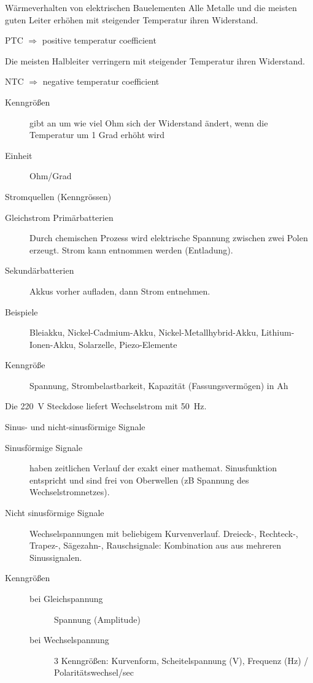 \documentclass[avery5371,grid,frame,a4paper]{flashcards}
\newcommand{\card}[3]{
  \begin{flashcard}[{\chap} -- #1]{#2}#3\end{flashcard}
}
\begin{document}
\card{05}{Wärmeverhalten von elektrischen Bauelementen}{
  Alle Metalle und die meisten guten Leiter erhöhen mit steigender Temperatur ihren Widerstand.
  \centerline{PTC $\Rightarrow$ positive temperatur coefficient}
  Die meisten Halbleiter verringern mit steigender Temperatur ihren Widerstand.
  \centerline{NTC $\Rightarrow$ negative temperatur coefficient}
  \small
  \begin{description}
    \item[Kenngrößen] gibt an um wie viel Ohm sich der Widerstand ändert, wenn die Temperatur um 1 Grad erhöht wird
    \item[Einheit] Ohm/Grad
  \end{description}
}

\card{06}{Stromquellen (Kenngrössen)}{
  \footnotesize
  \begin{description}
    \item[Gleichstrom Primärbatterien] Durch chemischen Prozess wird elektrische Spannung zwischen zwei Polen erzeugt. Strom kann entnommen werden (Entladung).
    \item[Sekundärbatterien] Akkus vorher aufladen, dann Strom entnehmen.
    \item[Beispiele]
      Bleiakku, Nickel-Cadmium-Akku, Nickel-Metallhybrid-Akku, Lithium-Ionen-Akku,
      Solarzelle, Piezo-Elemente
    \item[Kenngröße] Spannung, Strombelastbarkeit, Kapazität (Fassungsvermögen) in Ah
  \end{description}
  Die 220~V Steckdose liefert Wechselstrom mit 50~Hz.
}

\card{07}{Sinus- und nicht-sinusförmige Signale}{
  \footnotesize
  \begin{description}
    \item[Sinusförmige Signale] haben zeitlichen Verlauf der exakt einer mathemat. Sinusfunktion entspricht und sind frei von Oberwellen (zB Spannung des Wechselstromnetzes).
    \item[Nicht sinusförmige Signale]
      Wechselspannungen mit beliebigem Kurvenverlauf.
      Dreieck-, Rechteck-, Trapez-, Sägezahn-, Rauschsignale: Kombination aus aus mehreren Sinussignalen.
    \item[Kenngrößen]
      \begin{description}
        \item[bei Gleichspannung] Spannung (Amplitude)
        \item[bei Wechselspannung] 3 Kenngrößen: Kurvenform, Scheitelspannung (V), Frequenz (Hz) / Polaritätswechsel/sec
      \end{description}
  \end{description}
}
\end{document}
